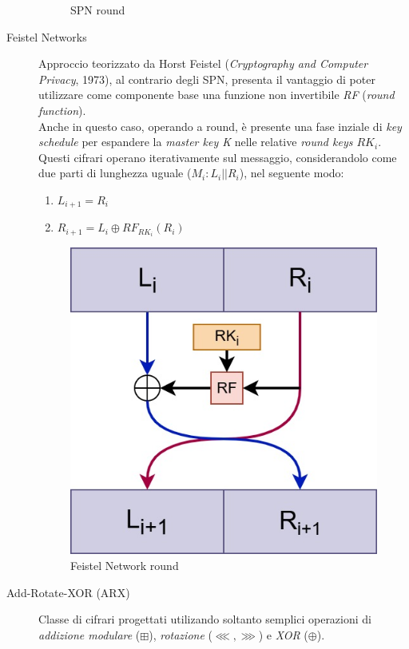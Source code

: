 \documentclass[target=bach,aauheader=,style=]{thud}
\begin{document}
\begin{description}
\begin{figure}[h!]
\begin{tikzpicture}
                    \end{tikzpicture}
                    \caption{SPN round}
                    \label{fig:spn}
                \end{figure}
                \nocite{TikZ:for:Cryptographers}
                \item[Feistel Networks \cite{moderncrypto}] Approccio teorizzato da Horst Feistel (\textit{Cryptography and Computer Privacy}, 1973), al contrario degli SPN, presenta il vantaggio di poter utilizzare come componente base una funzione non invertibile \textit{RF} (\textit{round function}).\\
                Anche in questo caso, operando a round, è presente una fase inziale di \textit{key schedule} per espandere la \textit{master key K} nelle relative \textit{round keys $RK_i$}.\\
                Questi cifrari operano iterativamente sul messaggio, considerandolo come due parti di lunghezza uguale ($M_i:L_i||R_i$), nel seguente modo:
                \begin{enumerate}
                    \item $L_{i+1} = R_i$
                    \item $R_{i+1} = L_i \oplus RF_{RK_i}(R_i)$
                \end{enumerate}
                \begin{figure}[htbp]
                    \centering
                    \includegraphics[width=0.5\linewidth]{img/feistel_round.jpg}
                    \caption{Feistel Network round}
                    \label{fig:placeholder}
                \end{figure}
                \item[Add-Rotate-XOR (ARX)\cite{sparx}] Classe di cifrari progettati utilizando soltanto semplici operazioni di \textit{addizione modulare} ($\boxplus$), \textit{rotazione} ($\lll, \ggg$) e \textit{XOR} ($\oplus$).
            \end{description}
            
\end{document}
